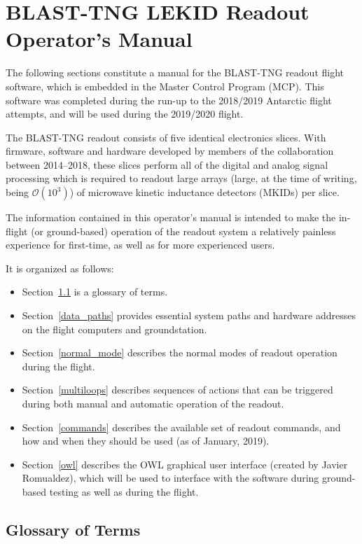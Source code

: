 \chapter{BLAST-TNG LEKID Readout Operator's Manual}\label{mcp}

The following sections constitute a manual for the BLAST-TNG readout flight software, which is embedded in the Master Control Program (MCP). This software was completed during the run-up to the 2018/2019 Antarctic flight attempts, and will be used during the 2019/2020 flight.

The BLAST-TNG readout consists of five identical electronics slices. With firmware, software and hardware developed by members of the collaboration between 2014--2018, these slices perform all of the digital and analog signal processing which is required to readout large arrays (large, at the time of writing, being $\mathcal{O}(10^{3})$) of microwave kinetic inductance detectors (MKIDs) per slice.

The information contained in this operator’s manual is intended to make the in-flight (or ground-based) operation of the readout system a relatively painless experience for first-time, as well as for more experienced users.

It is organized as follows:
\begin{itemize}[nosep]
  \item Section~\ref{gloss} is a glossary of terms.
  \item Section~\ref{data_paths} provides essential system paths and hardware addresses on the flight computers and groundstation.
  \item Section~\ref{normal_mode} describes the normal modes of readout operation during the flight.
  \item Section~\ref{multiloops} describes sequences of actions that can be triggered during both manual and automatic operation of the readout.
  \item Section~\ref{commands} describes the available set of readout commands, and how and when they should be used (as of January, 2019).
  \item Section~\ref{owl} describes the OWL graphical user interface (created by Javier Romualdez), which will be used to interface with the software during ground-based testing as well as during the flight.
\end{itemize}

\section{Glossary of Terms}\label{gloss}

